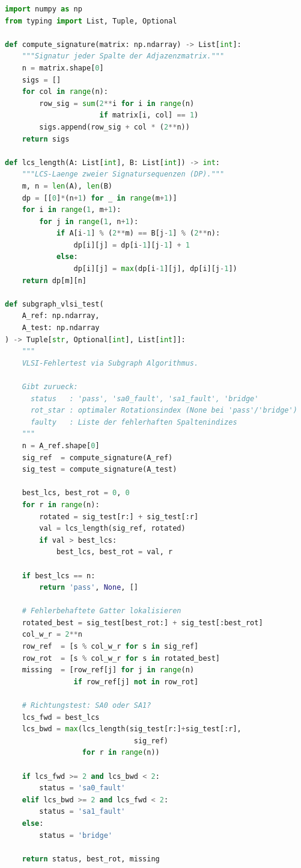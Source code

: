 ﻿\documentclass[a4paper,12pt]{article}
\theoremstyle{definition}
\begin{document}
\begin{lstlisting}[language=Python,
                   caption={Signaturberechnung und Rotationssuche fÃ¼r VLSI-Schaltkreisgraphen}]
import numpy as np
from typing import List, Tuple, Optional

def compute_signature(matrix: np.ndarray) -> List[int]:
    """Signatur jeder Spalte der Adjazenzmatrix."""
    n = matrix.shape[0]
    sigs = []
    for col in range(n):
        row_sig = sum(2**i for i in range(n)
                      if matrix[i, col] == 1)
        sigs.append(row_sig + col * (2**n))
    return sigs

def lcs_length(A: List[int], B: List[int]) -> int:
    """LCS-Laenge zweier Signatursequenzen (DP)."""
    m, n = len(A), len(B)
    dp = [[0]*(n+1) for _ in range(m+1)]
    for i in range(1, m+1):
        for j in range(1, n+1):
            if A[i-1] % (2**m) == B[j-1] % (2**n):
                dp[i][j] = dp[i-1][j-1] + 1
            else:
                dp[i][j] = max(dp[i-1][j], dp[i][j-1])
    return dp[m][n]

def subgraph_vlsi_test(
    A_ref: np.ndarray,
    A_test: np.ndarray
) -> Tuple[str, Optional[int], List[int]]:
    """
    VLSI-Fehlertest via Subgraph Algorithmus.

    Gibt zurueck:
      status   : 'pass', 'sa0_fault', 'sa1_fault', 'bridge'
      rot_star : optimaler Rotationsindex (None bei 'pass'/'bridge')
      faulty   : Liste der fehlerhaften Spaltenindizes
    """
    n = A_ref.shape[0]
    sig_ref  = compute_signature(A_ref)
    sig_test = compute_signature(A_test)

    best_lcs, best_rot = 0, 0
    for r in range(n):
        rotated = sig_test[r:] + sig_test[:r]
        val = lcs_length(sig_ref, rotated)
        if val > best_lcs:
            best_lcs, best_rot = val, r

    if best_lcs == n:
        return 'pass', None, []

    # Fehlerbehaftete Gatter lokalisieren
    rotated_best = sig_test[best_rot:] + sig_test[:best_rot]
    col_w_r = 2**n
    row_ref  = [s % col_w_r for s in sig_ref]
    row_rot  = [s % col_w_r for s in rotated_best]
    missing  = [row_ref[j] for j in range(n)
                if row_ref[j] not in row_rot]

    # Richtungstest: SA0 oder SA1?
    lcs_fwd = best_lcs
    lcs_bwd = max(lcs_length(sig_test[r:]+sig_test[:r],
                              sig_ref)
                  for r in range(n))

    if lcs_fwd >= 2 and lcs_bwd < 2:
        status = 'sa0_fault'
    elif lcs_bwd >= 2 and lcs_fwd < 2:
        status = 'sa1_fault'
    else:
        status = 'bridge'

    return status, best_rot, missing
\end{lstlisting}
\end{document}
